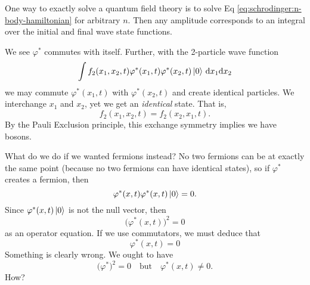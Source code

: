One way to exactly solve a quantum field theory is to solve Eq
\eqref{eq:schrodinger:n-body-hamiltonian} for arbitrary $n$. Then any
amplitude corresponds to an integral over the initial and final wave
state functions. 


We see $\varphi^{*}$ commutes with itself. Further, with the 2-particle
wave function 
\begin{equation*}
\int f_{2}(x_{1}, x_{2}, t)\varphi^{*}(x_{1},t)\varphi^{*}(x_{2},t)\ket{0}\,\mathrm{d}{x_{1}}\mathrm{d}{x_{2}}
\end{equation*}
we may commute $\varphi^{*}(x_{1},t)$ with $\varphi^{*}(x_{2},t)$ and
create identical particles. We interchange $x_{1}$ and $x_{2}$, yet we
get an \emph{identical} state. That is,
\begin{equation}
f_{2}(x_{1},x_{2},t) = f_{2}(x_{2},x_{1},t).
\end{equation}
By the Pauli Exclusion principle, this exchange symmetry implies we have
bosons. 

What do we do if we wanted fermions instead? No two fermions can be at
exactly the same point (because no two fermions can have identical
states), so if $\varphi^{*}$ creates a fermion, then
\begin{equation}
\varphi^{*}(x,t)\varphi^{*}(x,t)\ket{0}=0.
\end{equation}
Since $\varphi^{*}(x,t)\ket{0}$ is not the null vector, then
\begin{equation}
\bigl(\varphi^{*}(x,t)\bigr)^{2}=0
\end{equation}
as an operator equation. If we use commutators, we must deduce that
\begin{equation}
\varphi^{*}(x,t)=0
\end{equation}
Something is clearly wrong. We ought to have
\begin{equation}
\bigl(\varphi^{*}\bigr)^{2}=0\quad\mbox{but}\quad\varphi^{*}(x,t)\neq0.
\end{equation}
How?

